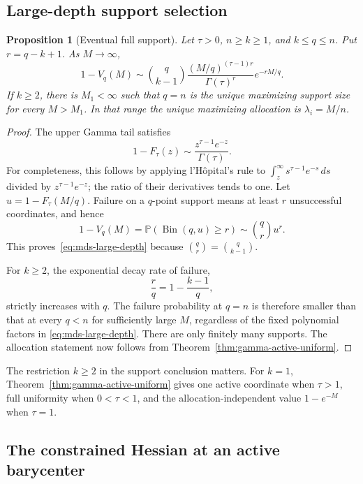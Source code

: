 \documentclass[11pt]{article}
\newtheorem{proposition}{Proposition}
\theoremstyle{definition}
\theoremstyle{remark}
\DeclareMathOperator{\Bin}{Bin}
\newcommand{\Pbb}{\mathbb P}
\newcommand{\1}{\mathbf 1}
\begin{document}
\subsection{Large-depth support selection}

\begin{proposition}[Eventual full support]
\label{prop:mds-large-depth}
Let \(\tau>0\), \(n\ge k\ge1\), and \(k\le q\le n\).  Put
\(r=q-k+1\).  As \(M\to\infty\),
\begin{equation}\label{eq:mds-large-depth}
  1-V_q(M)
  \sim
  \binom q{k-1}
  \frac{(M/q)^{(\tau-1)r}}{\Gamma(\tau)^r}
  e^{-rM/q}.
\end{equation}
If \(k\ge2\), there is \(M_1<\infty\) such that \(q=n\) is the
unique maximizing support size for every \(M>M_1\).  In that range
the unique maximizing allocation is \(\lambda_i=M/n\).
\end{proposition}

\begin{proof}
The upper Gamma tail satisfies
\[
  1-F_\tau(z)\sim\frac{z^{\tau-1}e^{-z}}{\Gamma(\tau)}.
\]
For completeness, this follows by applying l'H\^opital's rule to
\(\int_z^\infty s^{\tau-1}e^{-s}\,ds\) divided by
\(z^{\tau-1}e^{-z}\); the ratio of their derivatives tends to one.
Let \(u=1-F_\tau(M/q)\).  Failure on a \(q\)-point support means at
least \(r\) unsuccessful coordinates, and hence
\[
  1-V_q(M)=\Pbb(\Bin(q,u)\ge r)
  \sim\binom qr u^r.
\]
This proves~\eqref{eq:mds-large-depth} because
\(\binom qr=\binom q{k-1}\).

For \(k\ge2\), the exponential decay rate of failure,
\[
  \frac rq=1-\frac{k-1}{q},
\]
strictly increases with \(q\).  The failure probability at \(q=n\)
is therefore smaller than that at every \(q<n\) for sufficiently
large \(M\), regardless of the fixed polynomial factors in
\eqref{eq:mds-large-depth}.  There are only finitely many supports.
The allocation statement now follows from
Theorem~\ref{thm:gamma-active-uniform}.
\end{proof}

The restriction \(k\ge2\) in the support conclusion matters.  For
\(k=1\), Theorem~\ref{thm:gamma-active-uniform} gives one active
coordinate when \(\tau>1\), full uniformity when \(0<\tau<1\), and
the allocation-independent value \(1-e^{-M}\) when \(\tau=1\).

\subsection{The constrained Hessian at an active barycenter}
\end{document}
